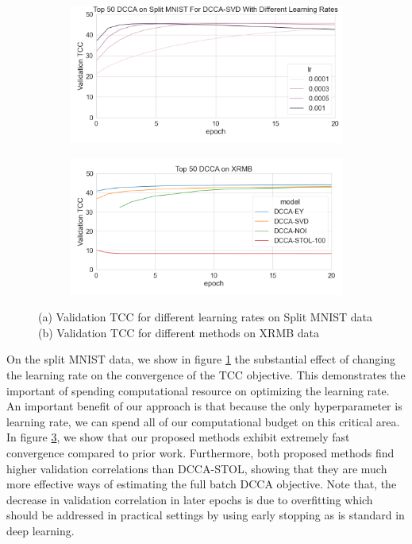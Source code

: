 \begin{figure}
     \centering
     \begin{subfigure}[b]{0.49\textwidth}
         \centering
         \includegraphics[width=\textwidth]{figures/deep_learning/DCCA/dcca_lr_experiment.png}
         \caption{}
         \label{fig:lrexp}
     \end{subfigure}
     \hfill
     \begin{subfigure}[b]{0.49\textwidth}
         \centering
         \includegraphics[width=\textwidth]{figures/deep_learning/DCCA/dcca_XRMB.png}
         \caption{}
                 \label{fig:xrmb}
     \end{subfigure}
        \caption{ (a) Validation TCC for different learning rates on Split MNIST data (b) Validation TCC for different methods on XRMB data}

\end{figure}

On the split MNIST data, we show in figure \ref{fig:lrexp} the substantial effect of changing the learning rate on the convergence of the TCC objective. This demonstrates the important of spending computational resource on optimizing the learning rate. An important benefit of our approach is that because the only hyperparameter is learning rate, we can spend all of our computational budget on this critical area. In figure \ref{fig:xrmb}, we show that our proposed methods exhibit extremely fast convergence compared to prior work. Furthermore, both proposed methods find higher validation correlations than DCCA-STOL, showing that they are much more effective ways of estimating the full batch DCCA objective. Note that, the decrease in validation correlation in later epochs is due to overfitting which should be addressed in practical settings by using early stopping as is standard in deep learning.

